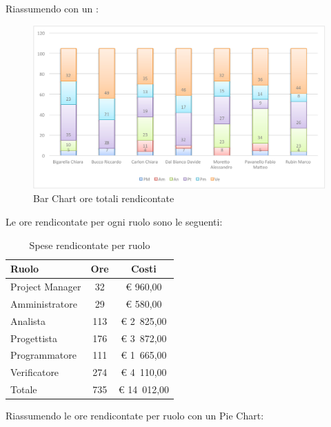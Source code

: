 			Riassumendo con un :
			\begin{figure}[H]\centering
				\includegraphics[width=\textwidth]{PianoDiProgetto/Pics/ChartOreRendic.pdf}
				\caption{Bar Chart ore totali rendicontate}
			\end{figure}
			Le ore rendicontate per ogni ruolo sono le seguenti:
			\begin{table}[H]
				\begin{center}
					\begin{tabular}{| l | c | c |}
						\hline
						Ruolo 				& Ore 		& Costi  \\ \hline
						
						Project Manager		& 32 		& \euro{} 960,00 	\\
						Amministratore 		& 29 		& \euro{} 580,00 	\\
						Analista	 		& 113 		& \euro{} 2~825,00 	\\
						Progettista 		& 176 		& \euro{} 3~872,00  	\\
						Programmatore		& 111 		& \euro{} 1~665,00 	\\
						Verificatore		& 274 		& \euro{} 4~110,00 	\\ \hline \hline
						
						Totale	 			& 735 		& \euro{} 14~012,00 	\\ \hline
					\end{tabular}
				\end{center}
				\caption{Spese rendicontate per ruolo}
			\end{table}
			Riassumendo le ore rendicontate per ruolo con un Pie Chart:
